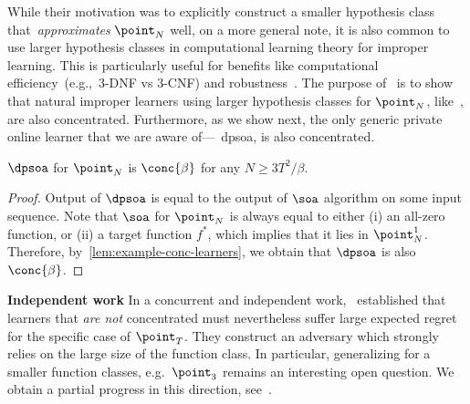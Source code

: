 While their motivation was to explicitly construct a smaller hypothesis class that~\emph{approximates} \(\point_N\) well, on a more general note, it is also common to use larger hypothesis classes in computational learning theory for improper learning. This is particularly useful for benefits like computational efficiency~(e.g.,~3-DNF vs 3-CNF) and robustness~\citep{diakonikolas2019distribution}. The purpose of~ is to show that natural improper learners using larger hypothesis classes for \(\point_N\), like~, are also \(\mathrm{concentrated}\). Furthermore, as we show next, the only generic private online learner that we are aware of---~\Gls{dpsoa}, is also concentrated.
\begin{corollary}\label{lem:dpsoa-conc}
    \(\dpsoa\) for \(\point_N\) is \(\conc{\beta}\) for any \(N \geq 3 T^2 / \beta\).
\end{corollary}
\begin{proof}
    Output of \(\dpsoa\) is equal to the output of \(\soa\) algorithm on some input sequence. 
    Note that \(\soa\) for \(\point_N\) is always equal to either (i) an all-zero function, or (ii) a target function \(f^{\ast}\),
    which implies that it lies in \(\point^1_N\).
    Therefore, by~\cref{lem:example-conc-learners}, we obtain that \(\dpsoa\) is also \(\conc{\beta}\).
\end{proof}


\noindent\textbf{Independent work} In a concurrent and independent work,~\citet{cohen2024lower} established that learners that \emph{are not} concentrated must nevertheless suffer large expected regret for the specific case of \(\point_T\). They construct an adversary which strongly relies on the large size of the function class. In particular, generalizing for a smaller function classes, e.g.~\(\point_3\) remains an interesting open question. We obtain a partial progress in this direction, see~.

